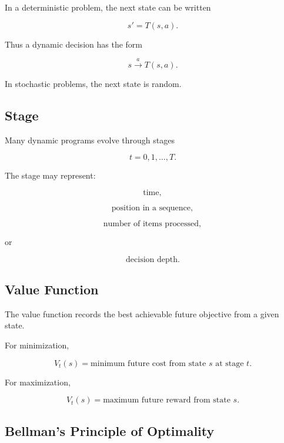 In a deterministic problem, the next state can be written

\[
\boxed{
s'
=
T(s,a).
}
\]

Thus a dynamic decision has the form

\[
\boxed{
s
\xrightarrow{a}
T(s,a).
}
\]

In stochastic problems, the next state is random.

\subsection{Stage}
\label{subsec:dynamic-programming-stage}

Many dynamic programs evolve through stages

\[
\boxed{
t=0,1,\ldots,T.
}
\]

The stage may represent:

\[
\boxed{
\text{time},
}
\]

\[
\boxed{
\text{position in a sequence},
}
\]

\[
\boxed{
\text{number of items processed},
}
\]

or

\[
\boxed{
\text{decision depth}.
}
\]

\subsection{Value Function}
\label{subsec:dynamic-programming-value-function}

The value function records the best achievable future objective from a
given state.

For minimization,

\[
\boxed{
V_t(s)
=
\text{minimum future cost from state }s\text{ at stage }t.
}
\]

For maximization,

\[
\boxed{
V_t(s)
=
\text{maximum future reward from state }s.
}
\]

\subsection{Bellman's Principle of Optimality}
\label{subsec:bellman-principle-optimality}

